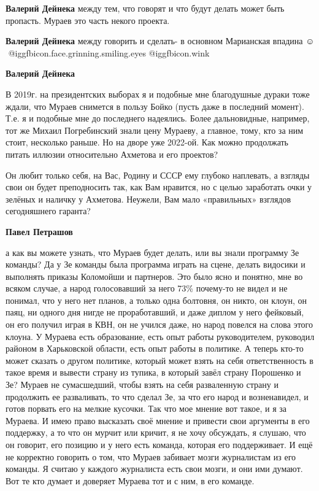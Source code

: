 \begin{itemize}
\begin{itemize}
\textbf{Валерий Дейнека} между тем, что говорят и что будут делать может быть пропасть. Мураев это часть некого проекта.

\textbf{Валерий Дейнека} между говорить и сделать- в основном Марианская впадина ☺ ️  @igg{fbicon.face.grinning.smiling.eyes}  @igg{fbicon.wink} 

\textbf{Валерий Дейнека} 

В 2019г. на президентских выборах я и подобные мне благодушные дураки тоже
ждали, что Мураев снимется в пользу Бойко (пусть даже в последний момент). Т.е.
я и подобные мне до последнего надеялись. Более дальновидные, например, тот же
Михаил Погребинский знали цену Мураеву, а главное, тому, кто за ним стоит,
несколько раньше. Но на дворе уже 2022-ой. Как можно продолжать питать иллюзии
относительно Ахметова и его проектов?


Он любит только себя, на Вас, Родину и СССР ему глубоко наплевать, а взгляды
свои он будет преподносить так, как Вам нравится, но с целью заработать очки у
зелёных и наличку у Ахметова. Неужели, Вам мало «правильных» взглядов
сегодняшнего гаранта?

\textbf{Павел Петрашов} 

а как вы можете узнать, что Мураев будет делать, или вы знали программу Зе
команды? Да у Зе команды была программа играть на сцене, делать видосики и
выполнять приказы Коломойши и партнеров. Это было ясно и понятно, мне во всяком
случае, а народ голосовавший за него 73\% почему-то не видел и не понимал, что
у него нет планов, а только одна болтовня, он никто, он клоун, он паяц, ни
одного дня нигде не проработавший, и даже диплом у него фейковый, он его
получил играя в КВН, он не учился даже, но народ повелся на слова этого клоуна.
У Мураева есть образование, есть опыт работы руководителем, руководил районом в
Харьковской области, есть опыт работы в политике. А теперь кто-то может сказать
о другом политике, который может взять на себя ответственность в такое время и
вывести страну из тупика, в который завёл страну Порошенко и Зе? Мураев не
сумасшедший, чтобы взять на себя разваленную страну и продолжить ее
разваливать, то что сделал Зе, за что его народ и возненавидел, и готов порвать
его на мелкие кусочки. Так что мое мнение вот такое, и я за Мураева. И имею
право высказать своё мнение и привести свои аргументы в его поддержку, а то что
он мурчит или кричит, я не хочу обсуждать, я слушаю, что он говорит, его
позицию и у него есть команда, которая его поддерживает. И ещё не корректно
говорить о том, что Мураев забивает мозги журналистам из его команды. Я считаю
у каждого журналиста есть свои мозги, и они ими думают. Вот те кто думает и
доверяет Мураева тот и с ним, в его команде.


\end{itemize}
\end{itemize}
